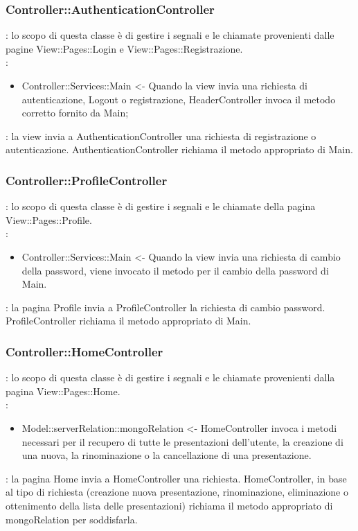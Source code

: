 	\subsubsection{Controller::\-AuthenticationController}{
		\textbf{\tipo}: lo scopo di questa classe è di gestire i segnali e le chiamate provenienti dalle pagine View::\-Pages::\-Login e View::\-Pages::\-Registrazione.\\	
		\textbf{\relaz}:
		\begin{itemize}
			\item Controller::\-Services::\-Main <- Quando la view invia una richiesta di autenticazione, Logout o registrazione, HeaderController invoca il metodo corretto fornito da Main;
		\end{itemize}
		\textbf{\interfacce}: la view invia a AuthenticationController una richiesta di registrazione o autenticazione. AuthenticationController richiama il metodo appropriato di Main.
	}
			
	\subsubsection{Controller::\-ProfileController}{
		\textbf{\tipo}: lo scopo di questa classe è di gestire i segnali e le chiamate della pagina View::\-Pages::\-Profile.\\	
		\textbf{\relaz}:
		\begin{itemize}
			\item Controller::\-Services::\-Main <- Quando la view invia una richiesta di cambio della password, viene invocato il metodo per il cambio della password di Main.
		\end{itemize}
		\textbf{\interfacce}: la pagina Profile invia a ProfileController la richiesta di cambio password. ProfileController richiama il metodo appropriato di Main.
	}

	\subsubsection{Controller::\-HomeController}{
		\textbf{\tipo}: lo scopo di questa classe è di gestire i segnali e le chiamate provenienti dalla pagina View::\-Pages::\-Home.\\	
		\textbf{\relaz}:
		\begin{itemize}
			\item Model::\-serverRelation::\-mongoRelation <- HomeController invoca i metodi necessari per il recupero di tutte le presentazioni dell'utente, la creazione di una nuova, la rinominazione o la cancellazione di una presentazione.
		\end{itemize}
		\textbf{\interfacce}: la pagina Home invia a HomeController una richiesta. HomeController, in base al tipo di richiesta (creazione nuova presentazione, rinominazione, eliminazione o ottenimento della lista delle presentazioni) richiama il metodo appropriato di mongoRelation per soddisfarla.
	}


